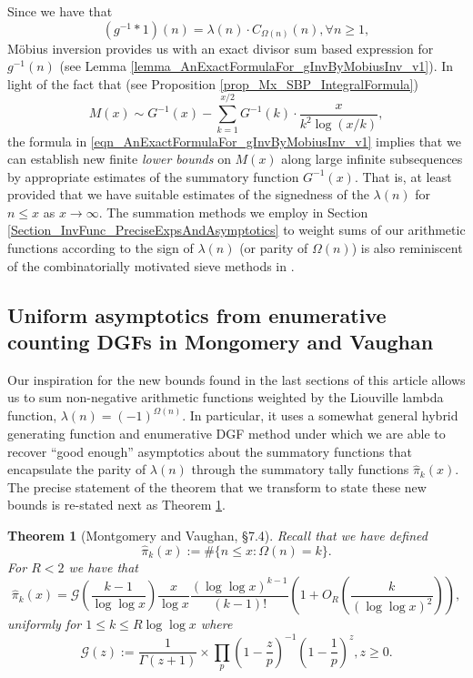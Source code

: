 \documentclass[11pt,reqno,a4letter]{article}
\numberwithin{figure}{section}
\numberwithin{table}{section}
\theoremstyle{plain}
\newtheorem{theorem}{Theorem}
\numberwithin{theorem}{section}
\theoremstyle{definition}
\begin{document}
Since we have that 
\begin{equation} 
\label{eqn_AnExactFormulaFor_gInvByMobiusInv_v1} 
(g^{-1} \ast 1)(n) = \lambda(n) \cdot C_{\Omega(n)}(n), \forall n \geq 1, 
\end{equation} 
M\"{o}bius inversion provides us with an exact divisor sum based expression for $g^{-1}(n)$ 
(see Lemma \ref{lemma_AnExactFormulaFor_gInvByMobiusInv_v1}). 
In light of the fact that (see Proposition \ref{prop_Mx_SBP_IntegralFormula}) 
\[
M(x) \sim G^{-1}(x) - \sum_{k=1}^{x/2} G^{-1}(k) \cdot \frac{x}{k^2 \log(x/k)}, 
\]
the formula in \eqref{eqn_AnExactFormulaFor_gInvByMobiusInv_v1} implies that we can establish 
new finite \emph{lower bounds} on $M(x)$ along large infinite subsequences 
by appropriate estimates of the summatory function $G^{-1}(x)$. 
That is, at least provided that we have suitable 
estimates of the signedness of the $\lambda(n)$ for $n \leq x$ as $x \rightarrow \infty$. 
The summation methods we employ in Section \ref{Section_InvFunc_PreciseExpsAndAsymptotics} 
to weight sums of our arithmetic functions according to the sign of 
$\lambda(n)$ (or parity of $\Omega(n)$) is also 
reminiscent of the combinatorially motivated sieve methods in 
\cite[\S 17]{OPERADECRIBERO}. 

\subsection{Uniform asymptotics from enumerative counting DGFs in Mongomery and Vaughan} 

Our inspiration for the new bounds found in the last sections of this article allows us to sum 
non-negative arithmetic functions weighted by the Liouville lambda function, 
$\lambda(n) = (-1)^{\Omega(n)}$. In particular, it uses a somewhat general 
hybrid generating function and enumerative DGF method 
under which we are able to recover ``good enough'' asymptotics about the summatory functions that 
encapsulate the parity of $\lambda(n)$ through the summatory tally functions $\widehat{\pi}_k(x)$. 
The precise statement of the theorem that we transform to state these new bounds is re-stated next as 
Theorem \ref{theorem_HatPi_ExtInTermsOfGz}. 

\begin{theorem}[Montgomery and Vaughan, \S 7.4]
\label{theorem_HatPi_ExtInTermsOfGz} 
Recall that we have defined 
$$\widehat{\pi}_k(x) := \#\{n \leq x: \Omega(n)=k\}.$$ 
For $R < 2$ we have that 
\[
\widehat{\pi}_k(x) = \mathcal{G}\left(\frac{k-1}{\log\log x}\right) \frac{x}{\log x} 
     \frac{(\log\log x)^{k-1}}{(k-1)!} \left(1 + O_R\left(\frac{k}{(\log\log x)^2}\right)\right),  
\]
uniformly for $1 \leq k \leq R \log\log x$ where 
\[
\mathcal{G}(z) := \frac{1}{\Gamma(z+1)} \times 
     \prod_p \left(1-\frac{z}{p}\right)^{-1} \left(1-\frac{1}{p}\right)^z, z \geq 0. 
\]
\end{theorem} 
\end{document}
